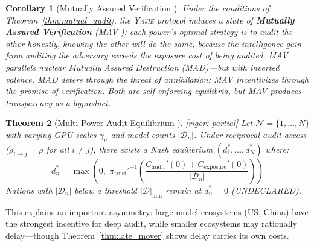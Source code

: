 \documentclass[11pt,a4paper]{article}
\newtheorem{theorem}{Theorem}[section]
\newtheorem{corollary}[theorem]{Corollary}
\theoremstyle{definition}
\theoremstyle{remark}
\newcommand{\rigorPartial}{\textcolor{orange!80!black}{[rigor: partial]}}
\newcommand{\Yajie}{\textsc{Yajie}}
\newcommand{\cD}{\mathcal{D}}
\newcommand{\undeclaredState}{\textsf{UNDECLARED}}
\newcommand{\trustPremium}{\pi_{\text{trust}}}
\newcommand{\gpuScale}{\gamma}
\newcommand{\nationSet}{\mathcal{N}}
\begin{document}
\begin{corollary}[Mutually Assured Verification ]
\label{cor:mav}
Under the conditions of Theorem~\ref{thm:mutual_audit}, the \Yajie{} protocol induces a state of \textbf{Mutually Assured Verification} (MAV ): each power's optimal strategy is to audit the other honestly, knowing the other will do the same, because the intelligence gain from auditing the adversary exceeds the exposure cost of being audited. MAV parallels nuclear Mutually Assured Destruction (MAD)---but with inverted valence. MAD deters through the threat of annihilation; MAV incentivizes through the promise of verification. Both are self-enforcing equilibria, but MAV produces \textit{transparency} as a byproduct.
\end{corollary}
\begin{theorem}[Multi-Power Audit Equilibrium ] \label{thm:multipower}
\rigorPartial
Let $\nationSet = \{1, \ldots, N\}$ with varying GPU scales $\gpuScale_n$ and model counts $|\cD_n|$. Under reciprocal audit access ($\rho_{i \to j} = \rho$ for all $i \neq j$), there exists a Nash equilibrium $(d_1^*, \ldots, d_N^*)$ where:
\begin{equation}
    d_n^* = \max\left(0, \; \trustPremium'^{-1}\left(\frac{C_{\text{audit}}'(0) + C_{\text{exposure}}'(0)}{|\cD_n|}\right)\right)
    \label{eq:heterogeneous_eq}
\end{equation}
Nations with $|\cD_n|$ below a threshold $|\cD|_{\min}$ remain at $d_n^* = 0$ (\undeclaredState).
\end{theorem}
This explains an important asymmetry: large model ecosystems (US, China) have the strongest incentive for deep audit, while smaller ecosystems may rationally delay---though Theorem~\ref{thm:late_mover} shows delay carries its own costs.
\end{document}
